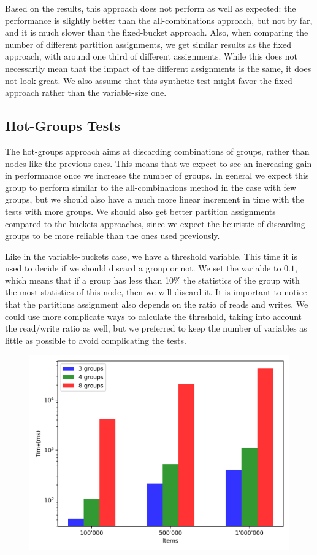 Based on the results, this approach does not perform as well as expected: the performance is slightly better than the all-combinations approach, but not by far, and it is much slower than the fixed-bucket approach. Also, when comparing the number of different partition assignments, we get similar results as the fixed approach, with around one third of different assignments. While this does not necessarily mean that the impact of the different assignments is the same, it does not look great. We also assume that this synthetic test might favor the fixed approach rather than the variable-size one.

\subsection{Hot-Groups Tests}\label{sec:hot-groups-tests}
The hot-groups approach aims at discarding combinations of groups, rather than nodes like the previous ones. This means that we expect to see an increasing gain in performance once we increase the number of groups. In general we expect this group to perform similar to the all-combinations method in the case with few groups, but we should also have a much more linear increment in time with the tests with more groups. We should also get better partition assignments compared to the buckets approaches, since we expect the heuristic of discarding groups to be more reliable than the ones used previously.

Like in the variable-buckets case, we have a threshold variable. This time it is used to decide if we should discard a group or not. We set the variable to $0.1$, which means that if a group has less than 10\% the statistics of the group with the most statistics of this node, then we will discard it. It is important to notice that the partitions assignment also depends on the ratio of reads and writes. We could use more complicate ways to calculate the threshold, taking into account the read/write ratio as well, but we preferred to keep the number of variables as little as possible to avoid complicating the tests.

\begin{figure}[!htb]
  \centering
  \includegraphics[width=\textwidth,height=\textheight,keepaspectratio]{img/hot.png}
  \caption[caption]{ }
  \label{fig:hot}
\end{figure}

